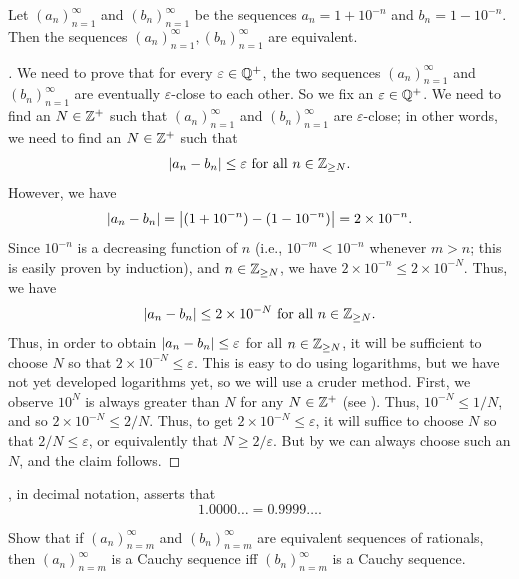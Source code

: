 \begin{prop}\label{i:5.2.8}
  Let \((a_n)_{n = 1}^{\infty}\) and \((b_n)_{n = 1}^{\infty}\) be the sequences \(a_n = 1 + 10^{-n}\) and \(b_n = 1 - 10^{-n}\).
  Then the sequences \((a_n)_{n = 1}^{\infty}, (b_n)_{n = 1}^{\infty}\) are equivalent.
\end{prop}

\begin{proof}[]
  We need to prove that for every \(\varepsilon \in \mathbb{Q}^+\), the two sequences \((a_n)_{n = 1}^{\infty}\) and \((b_n)_{n = 1}^{\infty}\) are eventually \(\varepsilon\)-close to each other.
  So we fix an \(\varepsilon \in \mathbb{Q}^+\).
  We need to find an \(N \in \mathbb{Z}^+\) such that \((a_n)_{n = 1}^{\infty}\) and \((b_n)_{n = 1}^{\infty}\) are \(\varepsilon\)-close;
  in other words, we need to find an \(N \in \mathbb{Z}^+\) such that
  \[
    \left\lvert a_n - b_n\right\rvert \leq \varepsilon \text{ for all } n \in \mathbb{Z}_{\geq N}.
  \]
  However, we have
  \[
    \left\lvert a_n - b_n\right\rvert = \left\lvert(1 + 10^{-n}) - (1 - 10^{-n})\right\rvert = 2 \times 10^{-n}.
  \]
  Since \(10^{-n}\) is a decreasing function of \(n\) (i.e., \(10^{-m} < 10^{-n}\) whenever \(m > n\);
  this is easily proven by induction), and \(n \in \mathbb{Z}_{\geq N}\), we have \(2 \times 10^{-n} \leq 2 \times 10^{-N}\).
  Thus, we have
  \[
    \left\lvert a_n - b_n\right\rvert \leq 2 \times 10^{-N} \text{ for all } n \in \mathbb{Z}_{\geq N}.
  \]
  Thus, in order to obtain \(\left\lvert a_n - b_n\right\rvert \leq \varepsilon\) for all \(n \in \mathbb{Z}_{\geq N}\), it will be sufficient to choose \(N\) so that \(2 \times 10^{-N} \leq \varepsilon\).
  This is easy to do using logarithms, but we have not yet developed logarithms yet, so we will use a cruder method.
  First, we observe \(10^N\) is always greater than \(N\) for any \(N \in \mathbb{Z}^+\) (see ).
  Thus, \(10^{-N} \leq 1 / N\), and so \(2 \times 10^{-N} \leq 2 / N\).
  Thus, to get \(2 \times 10^{-N} \leq \varepsilon\), it will suffice to choose \(N\) so that \(2 / N \leq \varepsilon\), or equivalently that \(N \geq 2 / \varepsilon\).
  But by  we can always choose such an \(N\), and the claim follows.
\end{proof}

\begin{rmk}\label{i:5.2.9}
  , in decimal notation, asserts that
  \[
    1.0000 \dots = 0.9999 \dots.
  \]
\end{rmk}

\exercisesection

\begin{ex}\label{i:ex:5.2.1}
  Show that if \((a_n)_{n = m}^{\infty}\) and \((b_n)_{n = m}^{\infty}\) are equivalent sequences of rationals, then \((a_n)_{n = m}^{\infty}\) is a Cauchy sequence iff \((b_n)_{n = m}^{\infty}\) is a Cauchy sequence.
\end{ex}

